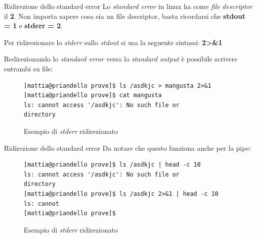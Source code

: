 \begin{frame}[fragile]{Ridirezione dello standard error}
  Lo \textit{standard error} in linux ha come \textit{file descriptor} il \textbf{2}. 
  Non importa sapere cosa sia un file descriptor, basta ricordarsi che
  \textbf{stdout = 1} e \textbf{stderr = 2}. \medskip

  Per ridirezionare lo \textit{stderr} sullo \textit{stdout} si usa la seguente sintassi:
  \textbf{2>\&1} \medskip

  Redirezionando lo \textit{standard error} verso lo \textit{standard output} è possibile scrivere
  entrambi su file:
  \begin{figure}
    \begin{lstlisting}
[mattia@priandello prove]$ ls /asdkjc > mangusta 2>&1 
[mattia@priandello prove]$ cat mangusta
ls: cannot access '/asdkjc': No such file or 
directory
\end{lstlisting}
    \caption{Esempio di \textit{stderr} ridirezionato}
  \end{figure}
\end{frame}

\begin{frame}[fragile]{Ridirezione dello standard error}
  Da notare che questo funziona anche per la pipe:
  \begin{figure}
    \begin{lstlisting}
[mattia@priandello prove]$ ls /asdkjc | head -c 10
ls: cannot access '/asdkjc': No such file or 
directory
[mattia@priandello prove]$ ls /asdkjc 2>&1 | head -c 10
ls: cannot
[mattia@priandello prove]$
\end{lstlisting}
    \caption{Esempio di \textit{stderr} ridirezionato}
  \end{figure}
\end{frame}
